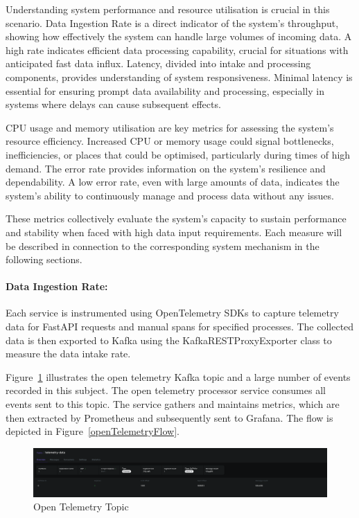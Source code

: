 \documentclass[preprint,12pt]{elsarticle}
\begin{document}
Understanding system performance and resource utilisation is crucial in this scenario. Data Ingestion Rate is a direct indicator of the system's throughput, showing how effectively the system can handle large volumes of incoming data. A high rate indicates efficient data processing capability, crucial for situations with anticipated fast data influx. Latency, divided into intake and processing components, provides understanding of system responsiveness. Minimal latency is essential for ensuring prompt data availability and processing, especially in systems where delays can cause subsequent effects. 

CPU usage and memory utilisation are key metrics for assessing the system's resource efficiency. Increased CPU or memory usage could signal bottlenecks, inefficiencies, or places that could be optimised, particularly during times of high demand. The error rate provides information on the system's resilience and dependability. A low error rate, even with large amounts of data, indicates the system's ability to continuously manage and process data without any issues. 

These metrics collectively evaluate the system's capacity to sustain performance and stability when faced with high data input requirements. Each measure will be described in connection to the corresponding system mechanism in the following sections.

\paragraph{Data Ingestion Rate:}
Each service is instrumented using OpenTelemetry SDKs to capture telemetry data for FastAPI requests and manual spans for specified processes. The collected data is then exported to Kafka using the KafkaRESTProxyExporter class to measure the data intake rate. 

Figure~\ref{openTelemetryTopic} illustrates the open telemetry Kafka topic and a large number of events recorded in this subject. The open telemetry processor service consumes all events sent to this topic. The service gathers and maintains metrics, which are then extracted by Prometheus and subsequently sent to Grafana. The flow is depicted in Figure~\ref{openTelemetryFlow}.


\begin{figure}[h!]
  \centering
  \includegraphics[width=\textwidth]{images/kafka-open-telemetry-topic-screenshot.png}
  \caption{Open Telemetry Topic}
  \label{openTelemetryTopic}
\end{figure}
\end{document}
